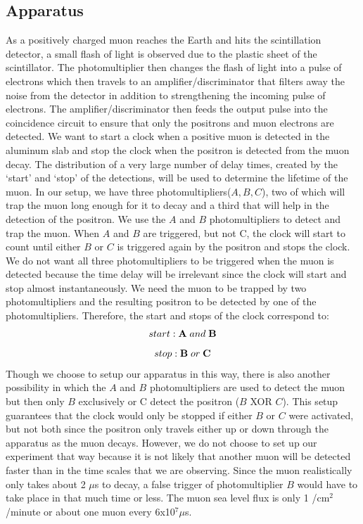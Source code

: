 \subsection{Apparatus}
\indent  \indent As a positively charged muon reaches the Earth and hits the scintillation detector, a small flash of light is observed due to the plastic sheet of the scintillator. The photomultiplier then changes the flash of light into a pulse of electrons which then travels to an amplifier/discriminator that filters away the noise from the detector in addition to strengthening the incoming pulse of electrons. The amplifier/discriminator then feeds the output pulse into the coincidence circuit to ensure that only the positrons and muon electrons are detected. 
\newline \indent We want to start a clock when a positive muon is detected in the aluminum slab and stop the clock when the positron is detected from the muon decay. The distribution of a very large number of delay times, created by the `start' and `stop' of the detections, will be used to determine the lifetime of the muon. 
\newline \indent In our setup, we have three photomultipliers($A, B, C$), two of which will trap the muon long enough for it to decay and a third that will help in the detection of the positron. We use the $A$ and $B$ photomultipliers to detect and trap the muon. When $A$ and $B$ are triggered, but not C, the clock will start to count until either $B$ or $C$ is triggered again by the positron and stops the clock. We do not want all three photomultipliers to be triggered when the muon is detected because the time delay will be irrelevant since the clock will start and stop almost instantaneously. We need the muon to be trapped by two photomultipliers and the resulting positron to be detected by one of the photomultipliers. Therefore, the start and stops of the clock correspond to:
\begin{equation} start: \textbf A\;and\; \textbf B \end{equation}
\begin{equation} stop: \textbf B\; or\; \textbf C \end{equation}
Though we choose to setup our apparatus in this way, there is also another possibility in which the $A$ and $B$ photomultipliers are used to detect the muon but then only $B$ exclusively or C detect the positron ($B$ XOR $C$). This setup guarantees that the clock would only be stopped if either $B$ or $C$ were activated, but not both since the positron only travels either up or down through the apparatus as the muon decays. However, we do not choose to set up our experiment that way because it is not likely that another muon will be detected faster than in the time scales that we are observing. Since the muon realistically only takes about 2 $\mu$s to decay, a false trigger of photomultiplier $B$ would have to take place in that much time or less. The muon sea level flux is only 1 /cm$^2$/minute or about one muon every 6x10$^7\mu$s.%
